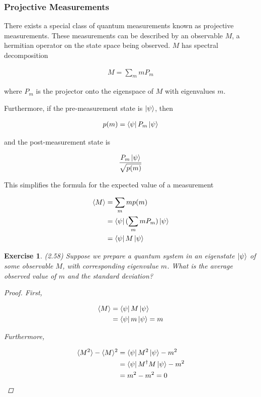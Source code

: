 \documentclass[11pt]{article}
\newcommand\0{\mathbf{0}}
\newcommand\<{\langle}
\renewcommand\>{\rangle}
\newtheorem{exercise}[theorem]{Exercise}
\begin{document}
\subsubsection{Projective Measurements}

There exists a special class of quantum measurements known as projective measurements. These measurements can be described by an observable $M$, a hermitian operator on the state space being observed. $M$ has spectral decomposition

\begin{align*}
M = \sum_m m P_m	
\end{align*}

where $P_m$ is the projector onto the eigenspace of $M$ with eigenvalues $m$. 

Furthermore, if the pre-measurement state is $\ket{\psi}$, then 

\begin{align*}
p(m) = 	\bra{\psi} P_m \ket{\psi}
\end{align*}

and the post-measurement state is 

\begin{align*}
	\frac{P_m \ket{\psi}}{\sqrt{p(m)}}
\end{align*}

This simplifies the formula for the expected value of a measurement

\begin{align*}
\langle M \rangle &= \sum_m m p(m) \\
&= \bra{\psi} (\sum_m m P_m)  \ket{\psi} \\
&= 	\bra{\psi} M \ket{\psi}
\end{align*}

\begin{exercise}
	(2.58) Suppose we prepare a quantum system in an eigenstate $\ket{\psi}$ of some observable $M$, with corresponding eigenvalue $m$. What is the average observed value of $m$ and the standard deviation?
	
	\begin{proof}
		First, 
		
		\begin{align*}
	\< M \> &= \bra{\psi} M 	\ket{\psi} \\
	&= \bra{\psi} m \ket{\psi} = m
	\end{align*}
	
	Furthermore,

	\begin{align*}
	\< M^2 \> - \< M \>^2 &= \bra{\psi} M^2 	\ket{\psi} - m^2 \\
	&= \bra{\psi} M^\dag M \ket{\psi} -m^2 \\
	&= m^2 - m^2 = 0
	\end{align*}
	\end{proof}	
	
\end{exercise} 
\end{document}
